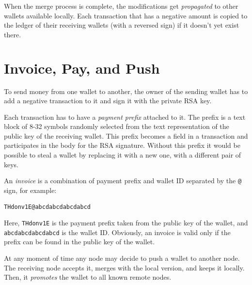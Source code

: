 \documentclass[11pt,oneside]{article}
\newcommand\dd[1]{\colorbox{gray!30}{\texttt{#1}}}
\begin{document}
When the merge process is complete, the modifications get \emph{propagated} to other wallets
available locally. Each transaction that has a negative amount is
copied to the ledger of their receiving wallets (with a reversed sign)
if it doesn't yet exist there.

\section{Invoice, Pay, and Push}\label{sec:pay}

To send money from one wallet to another, the owner of the sending wallet
has to add a negative transaction to it and sign it with the private RSA key.

Each transaction has to have a \emph{payment prefix} attached to it.
The prefix is a text block of 8-32 symbols randomly selected from the
text representation of the public key of the receiving wallet. This prefix
becomes a field in a transaction and participates in the body for the RSA
signature. Without this prefix it would be possible to steal a wallet by
replacing it with a new one, with a different pair of keys.

An \emph{invoice} is a combination of payment prefix and wallet ID separated
by the \dd{@} sign, for example:

\begin{verbatim}
THdonv1E@abcdabcdabcdabcd
\end{verbatim}

Here, \dd{THdonv1E} is the payment prefix taken from the public key of
the wallet, and \dd{abcdabcdabcdabcd} is the wallet ID. Obviously, an
invoice is valid only if the prefix can be found in the public key of the wallet.

At any moment of time any node may decide to push a wallet to another node.
The receiving node accepts it, merges with the local version, and keeps it locally.
Then, it \emph{promotes} the wallet to all known remote nodes.

\end{document}
